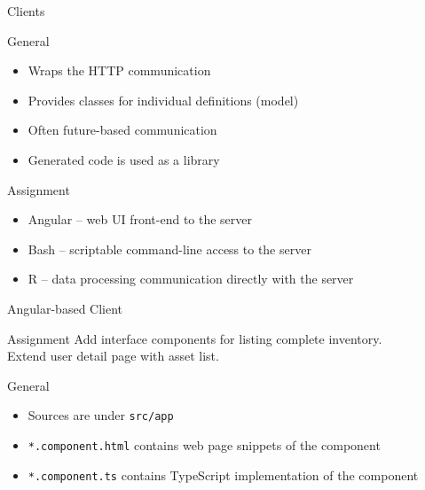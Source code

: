 \begin{frame}{Clients}
    \begin{block}{General}
        \begin{itemize}
            \item Wraps the HTTP communication
            \item Provides classes for individual definitions (model)
            \item Often future-based communication
            \item Generated code is used as a library
        \end{itemize}
    \end{block}
    \begin{block}{Assignment}
        \begin{itemize}
            \item Angular -- web UI front-end to the server
            \item Bash -- scriptable command-line access to the server
            \item R -- data processing communication directly with the server
        \end{itemize}
    \end{block}
\end{frame}

\begin{frame}{Angular-based Client}
    \begin{block}{Assignment}
        Add interface components for listing complete inventory. \\
        Extend user detail page with asset list.
    \end{block}

    \begin{block}{General}
        \begin{itemize}
            \item Sources are under \lstinline{src/app}
            \item \lstinline{*.component.html} contains web page snippets of the component
            \item \lstinline{*.component.ts} contains TypeScript implementation of the component
        \end{itemize}
    \end{block}
\end{frame}


